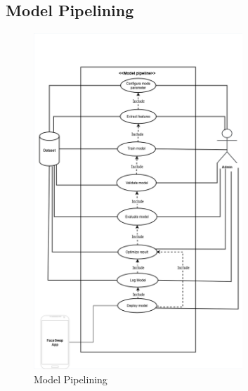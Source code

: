 \documentclass[12pt,a4paper]{report}
\begin{document}
\subsection{Model Pipelining}
\begin{figure}[H]
\centering
\includegraphics[width=0.7\textwidth]{figures/model_pipeline_diagram.png}
\caption{Model Pipelining}
\label{fig:model_pipeline}
\end{figure}
\end{document}
